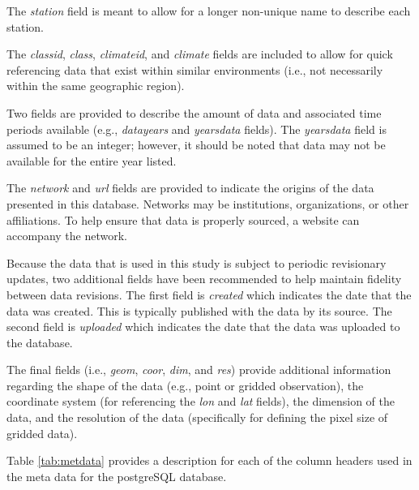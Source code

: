 The \emph{station} field is meant to allow for a longer non-unique name to describe each station.

The  \emph{classid}, \emph{class}, \emph{climateid}, and \emph{climate} fields are included to allow for quick referencing data that exist within similar environments (i.e., not necessarily within the same geographic region). 

Two fields are provided to describe the amount of data and associated time periods available (e.g., \emph{data\textunderscore years} and \emph{years\textunderscore data} fields). 
The \emph{years\textunderscore data} field is assumed to be an integer; however, it should be noted that data may not be available for the entire year listed.

The \emph{network} and \emph{url} fields are provided to indicate the origins of the data presented in this database.  
Networks may be institutions, organizations, or other affiliations.  
To help ensure that data is properly sourced, a website can accompany the network.  

Because the data that is used in this study is subject to periodic revisionary updates, two additional fields have been recommended to help maintain fidelity between data revisions.  
The first field is \emph{created} which indicates the date that the data was created.  
This is typically published with the data by its source.  
The second field is \emph{uploaded} which indicates the date that the data was uploaded to the database.  

The final fields (i.e., \emph{geom}, \emph{coor}, \emph{dim}, and \emph{res}) provide additional information regarding the shape of the data (e.g., point or gridded observation), the coordinate system (for referencing the \emph{lon} and \emph{lat} fields), the dimension of the data, and the resolution of the data (specifically for defining the pixel size of gridded data).

Table \ref{tab:metdata} provides a description for each of the column headers used in the meta data for the postgreSQL database.

